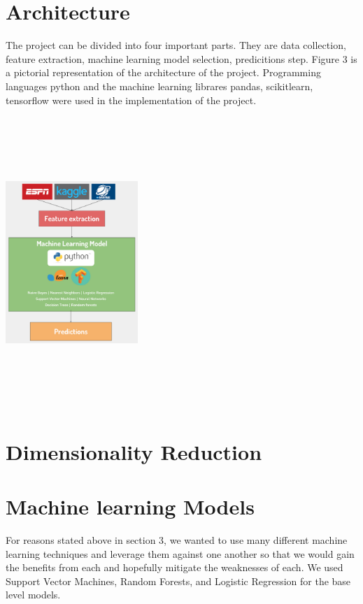 \documentclass{article}
\begin{document}
\begin{multicols}{2}
	\section{Architecture}
	The project can be divided into four important parts. They are data collection, feature extraction, machine learning model selection, predicitions step. Figure 3 is a pictorial representation of the architecture of the project. Programming languages python and the machine learning librares pandas, scikitlearn, tensorflow were used in the implementation of the project.	
	\begin{center}
	  \includegraphics[height=110mm,width=50mm]{images/Architecture.png}
	\end{center}
	
	\section{Dimensionality Reduction}
	\section{Machine learning Models}
	For reasons stated above in section 3, we wanted to use many different machine learning techniques and leverage them against one another so that we would gain the benefits from each and hopefully mitigate the weaknesses of each. We used Support Vector Machines, Random Forests, and Logistic Regression for the base level models.
	

\end{multicols}
\end{document}

